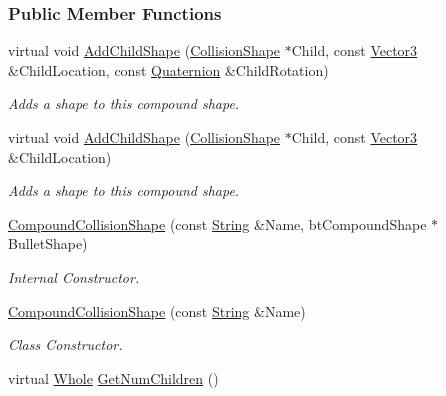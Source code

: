 \subsubsection*{Public Member Functions}
\begin{DoxyCompactItemize}
\item 
virtual void \hyperlink{classphys_1_1CompoundCollisionShape_a9de4fe3f0e2519bcfb249ed626122039}{AddChildShape} (\hyperlink{classphys_1_1CollisionShape}{CollisionShape} $\ast$Child, const \hyperlink{classphys_1_1Vector3}{Vector3} \&ChildLocation, const \hyperlink{classphys_1_1Quaternion}{Quaternion} \&ChildRotation)
\begin{DoxyCompactList}\small\item\em Adds a shape to this compound shape. \item\end{DoxyCompactList}\item 
virtual void \hyperlink{classphys_1_1CompoundCollisionShape_af612b00cac9c655624d5d842c0a92a58}{AddChildShape} (\hyperlink{classphys_1_1CollisionShape}{CollisionShape} $\ast$Child, const \hyperlink{classphys_1_1Vector3}{Vector3} \&ChildLocation)
\begin{DoxyCompactList}\small\item\em Adds a shape to this compound shape. \item\end{DoxyCompactList}\item 
\hyperlink{classphys_1_1CompoundCollisionShape_a544e8ead14df2e65c9b6301416ec9dbb}{CompoundCollisionShape} (const \hyperlink{namespacephys_aa03900411993de7fbfec4789bc1d392e}{String} \&Name, btCompoundShape $\ast$BulletShape)
\begin{DoxyCompactList}\small\item\em Internal Constructor. \item\end{DoxyCompactList}\item 
\hyperlink{classphys_1_1CompoundCollisionShape_a6e77531d152ce27bc5bf654591ae5cff}{CompoundCollisionShape} (const \hyperlink{namespacephys_aa03900411993de7fbfec4789bc1d392e}{String} \&Name)
\begin{DoxyCompactList}\small\item\em Class Constructor. \item\end{DoxyCompactList}\item 
virtual \hyperlink{namespacephys_a460f6bc24c8dd347b05e0366ae34f34a}{Whole} \hyperlink{classphys_1_1CompoundCollisionShape_aeb9b309286459d510c4027d180804c0b}{GetNumChildren} ()

\end{DoxyCompactItemize}
